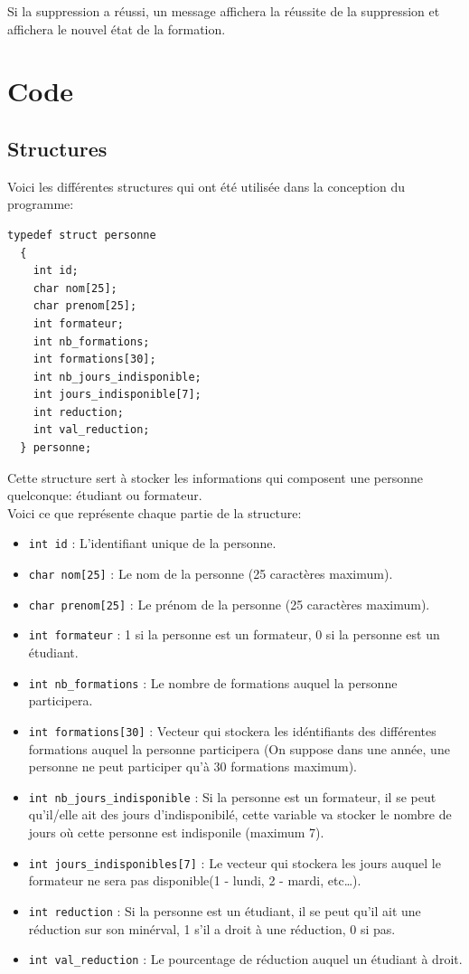 \documentclass[11pt]{article}
\begin{document}
Si la suppression a réussi, un message affichera la réussite de la suppression et affichera le nouvel état de la formation.

\newpage
\section{Code}
\subsection{Structures}
Voici les différentes structures qui ont été utilisée dans la conception du programme:

\begin{lstlisting}[firstnumber=30]
  typedef struct personne
  {
    int id;
    char nom[25];
    char prenom[25];
    int formateur;
    int nb_formations;
    int formations[30];
    int nb_jours_indisponible;
    int jours_indisponible[7];
    int reduction;
    int val_reduction;
  } personne;
\end{lstlisting}

Cette structure sert à stocker les informations qui composent une personne quelconque: étudiant ou formateur.\\
Voici ce que représente chaque partie de la structure:
\begin{itemize}
\item \texttt{int id} : L'identifiant unique de la personne.
\item \texttt{char nom[25]} : Le nom de la personne (25 caractères maximum).
\item \texttt{char prenom[25]} : Le prénom de la personne (25 caractères maximum).
\item \texttt{int formateur} : 1 si la personne est un formateur, 0 si la personne est un étudiant.
\item \texttt{int nb\_formations} : Le nombre de formations auquel la personne participera.
\item \texttt{int formations[30]} : Vecteur qui stockera les idéntifiants des différentes formations auquel la personne participera (On suppose dans une année, une personne ne peut participer qu'à 30 formations maximum).
\item \texttt{int nb\_jours\_indisponible} : Si la personne est un formateur, il se peut qu'il/elle ait des jours d'indisponibilé, cette variable va stocker le nombre de jours où cette personne est indisponile (maximum 7).
\item \texttt{int jours\_indisponibles[7]} : Le vecteur qui stockera les jours auquel le formateur ne sera pas disponible(1 - lundi, 2 - mardi, etc\ldots).
\item \texttt{int reduction} : Si la personne est un étudiant, il se peut qu'il ait une réduction sur son minérval, 1 s'il a droit à une réduction, 0 si pas.
\item \texttt{int val\_reduction} : Le pourcentage de réduction auquel un étudiant à droit.
\end{itemize}
\end{document}
